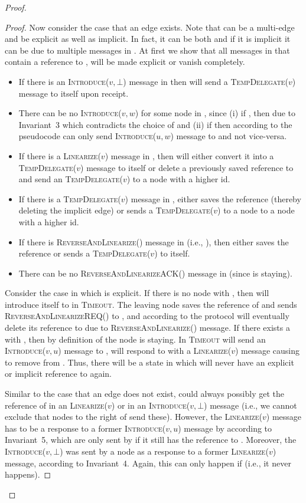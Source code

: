 \documentclass[a4paper,USenglish]{lipics}
\newcommand{\linearize}[1]{\textsc{Linearize(\ensuremath{#1})}\xspace}
\newcommand{\introduce}[1]{\textsc{Introduce(\ensuremath{#1})}\xspace}
\newcommand{\tempdelegate}[1]{\textsc{TempDelegate(\ensuremath{#1})}\xspace}
\newcommand{\timeout}{\textsc{Timeout}\xspace}
\newcommand{\revandlin}[1]{\textsc{ReverseAndLinearize(\ensuremath{#1})}\xspace} \newcommand{\revandlinREQ}[1]{\textsc{ReverseAndLinearizeREQ(#1)}\xspace}
\newcommand{\revandlinACK}[1]{\textsc{ReverseAndLinearizeACK(#1)}\xspace}
\begin{document}
\begin{proof}
\begin{proof}
Now consider the case that an edge  exists.
Note that  can be a multi-edge and be explicit as well as implicit. 
In fact, it can be both and if it is implicit it can be due to multiple messages in .
At first we show that all messages in  that contain a reference to , will be made explicit or vanish completely.
\begin{itemize}
\item If there is an \introduce{v,\bot} message in  then  will send a \tempdelegate{v} message to itself upon receipt.
\item There can be no \introduce{v,w} for some node  in , since (i) if , then due to Invariant~3  which contradicts the choice of  and (ii) if  then according to the pseudocode  can only send \introduce{u,w} message to  and not vice-versa.
\item If there is a \linearize{v} message in , then  will either convert it into a \tempdelegate{v} message to itself or delete a previously saved reference to  and send an \tempdelegate{v} to a node with a higher id.
\item If there is a \tempdelegate{v} message in ,  either saves the reference (thereby deleting the implicit edge) or sends a \tempdelegate{v} to a node to a node with a higher id.
\item If there is \revandlin{} message in  (i.e., ), then  either saves the reference or sends  a \tempdelegate{v} to itself.
\item There can be no \revandlinACK{} message in   (since  is staying).
\end{itemize}
Consider the case in which  is explicit.
If there is no node  with , then  will introduce itself to  in \timeout. 
The leaving node  saves the reference of  and sends \revandlinREQ{} to , and according to the protocol  will eventually delete its reference to  due to \revandlin{} message.
If there exists a  with , then by definition of  the node  is staying.
In \timeout  will send an \introduce{v,u} message to ,  will respond to  with a \linearize{v} message causing  to remove  from .
Thus, there will be a state in which  will never have an explicit or implicit reference to  again.

Similar to the case that an edge  does not exist,  could always possibly get the reference of  in an \linearize{v} or in an \introduce{v,\bot} message (i.e., we cannot exclude that nodes to the right of  send these). 
However, the \linearize{v} message has to be a response to a former \introduce{v,u} message by  according to Invariant~5, which are only sent by  if it still has the reference to .
Moreover, the \introduce{v,\bot} was sent by a node  as a response to a former \linearize{v} message, according to Invariant~4.
Again, this can only happen if    (i.e., it never happens). 


\end{proof}
\end{proof}
\end{document}
